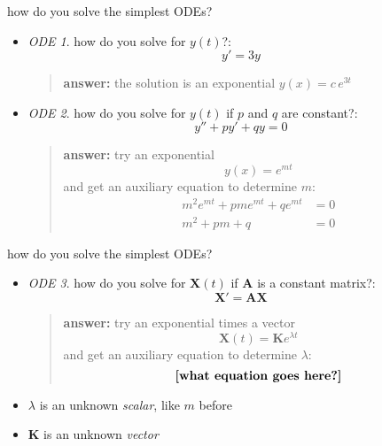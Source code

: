 \documentclass[urlcolor=blue,dvipsnames]{beamer}
\newcommand{\bA}{\mathbf{A}}
\newcommand{\bK}{\mathbf{K}}
\newcommand{\bX}{\mathbf{X}}
\begin{document}
\begin{frame}{how do you solve the simplest ODEs?}

\begin{itemize}
\item \emph{ODE 1}.  how do you solve for $y(t)$?:
    $$y'=3y$$
    \begin{quote}
    \textbf{answer:}  the solution is an exponential $y(x) = c\, e^{3t}$
    \end{quote}
\item \emph{ODE 2}.  how do you solve for $y(t)$ if $p$ and $q$ are constant?:
    $$y'' + p y' + q y = 0$$
    \begin{quote}
    \textbf{answer:}  try an exponential
        $$y(x) = e^{mt}$$
    and get an auxiliary equation to determine $m$:
\begin{align*}
m^2 e^{mt} + p m e^{mt} + q e^{mt} &= 0 \\
m^2 + p m + q &= 0
\end{align*}
    \end{quote}
\end{itemize}
\end{frame}


\begin{frame}{how do you solve the simplest ODEs?}

\begin{itemize}
\item \emph{ODE 3}.  how do you solve for $\bX(t)$ if $\bA$ is a constant matrix?:
    $$\bX' = \bA \bX$$
    \begin{quote}
    \textbf{answer:}  try an exponential times a vector
        $$\bX(t) = \bK e^{\lambda t}$$
    and get an auxiliary equation to determine $\lambda$:
        $$\text{\textbf{[what equation goes here?]}}$$
    \end{quote}
\item $\lambda$ is an unknown \emph{scalar}, like $m$ before
\item $\bK$ is an unknown \emph{vector}
\end{itemize}
\end{frame}
\end{document}
